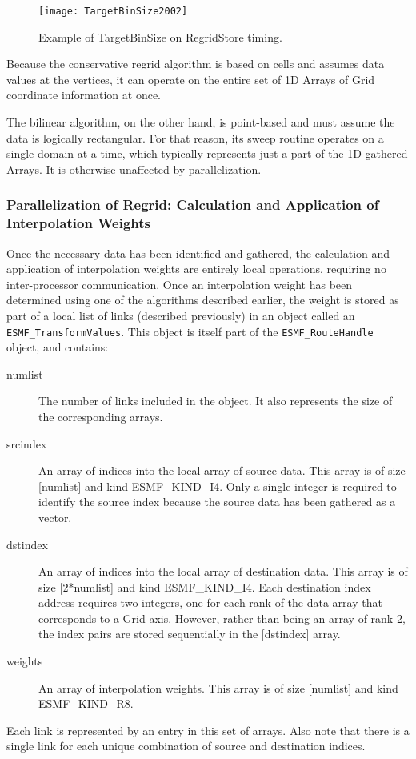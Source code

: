 \begin{center}
\begin{figure}
\caption{Example of TargetBinSize on RegridStore timing. }
\label{fig:TargetBinSize}
\resizebox{\textwidth}{!}
  {\texttt{[image: TargetBinSize2002]}}
\end{figure}
\end{center}

Because the conservative regrid algorithm is based on cells and assumes data
values at the vertices, it can operate on the entire set of 1D Arrays of Grid
coordinate information at once.

The bilinear algorithm, on the other hand, is point-based and must assume the
data is logically rectangular.  For that reason, its sweep routine operates on
a single domain at a time, which typically represents just a part of the 1D
gathered Arrays.  It is otherwise unaffected by parallelization.


\subsubsection{Parallelization of Regrid: Calculation and Application of
               Interpolation Weights}

Once the necessary data has been identified and gathered, the calculation and
application of interpolation weights are entirely local operations, requiring no
inter-processor communication.  Once an interpolation weight has been determined
using one of the algorithms described earlier, the weight is stored as part of a
local list of links (described previously) in an object called an
{\tt ESMF\_TransformValues}.  This object is itself part of the 
{\tt ESMF\_RouteHandle} object, and contains:
\begin{description}
   \item [numlist]
         The number of links included in the object.  It also represents the
         size of the corresponding arrays.
   \item [srcindex]
         An array of indices into the local array of source data.
         This array is of size [numlist] and kind ESMF_KIND_I4.  Only a single
         integer is required to identify the source index because the source data
         has been gathered as a vector.
   \item [dstindex]
         An array of indices into the local array of destination data.
         This array is of size [2*numlist] and kind ESMF_KIND_I4.  Each
         destination index address requires two integers, one for each rank
         of the data array that corresponds to a Grid axis.  However, rather
         than being an array of rank 2, the index pairs are stored sequentially
         in the [dstindex] array.
   \item [weights]
         An array of interpolation weights.  This array is of size [numlist] and
         kind ESMF_KIND_R8.
\end{description}
Each link is represented by an entry in this set of arrays.  Also note that there
is a single link for each unique combination of source and destination indices.

